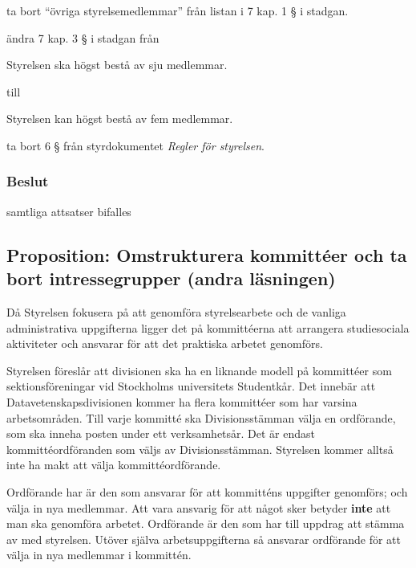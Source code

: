 \documentclass[protokoll]{dvd}
\begin{document}
\begin{attsatser}
	\item ta bort ``övriga styrelsemedlemmar'' från listan i 7 kap. 1 § i stadgan.
	\item ändra 7 kap. 3 § i stadgan från

	\begin{displayquote}
		Styrelsen ska högst bestå av sju medlemmar.
	\end{displayquote}

	till

	\begin{displayquote}
		Styrelsen kan högst bestå av fem medlemmar.
	\end{displayquote}

	\item ta bort 6 § från styrdokumentet \emph{Regler för styrelsen}.
\end{attsatser}

\subsubsection*{Beslut}
    \begin{attsatser}
        \item samtliga attsatser bifalles
    \end{attsatser}

\newpage
\subsection{Proposition: Omstrukturera kommittéer och ta bort intressegrupper (andra läsningen)}

Då Styrelsen fokusera på att genomföra styrelsearbete och de vanliga administrativa uppgifterna ligger det på kommittéerna att arrangera studiesociala aktiviteter och ansvarar för att det praktiska arbetet genomförs.

Styrelsen föreslår att divisionen ska ha en liknande modell på kommittéer som sektionsföreningar vid Stockholms universitets Studentkår.
Det innebär att Datavetenskapsdivisionen kommer ha flera kommittéer som har varsina arbetsområden.
Till varje kommitté ska Divisionsstämman välja en ordförande, som ska inneha posten under ett verksamhetsår.
Det är endast kommittéordföranden som väljs av Divisionsstämman.
Styrelsen kommer alltså inte ha makt att välja kommittéordförande.

Ordförande har är den som ansvarar för att kommitténs uppgifter genomförs; och välja in nya medlemmar.
Att vara ansvarig för att något sker betyder \textbf{inte} att man ska genomföra arbetet.
Ordförande är den som har till uppdrag att stämma av med styrelsen.
Utöver själva arbetsuppgifterna så ansvarar ordförande för att välja in nya medlemmar i kommittén.
\end{document}
